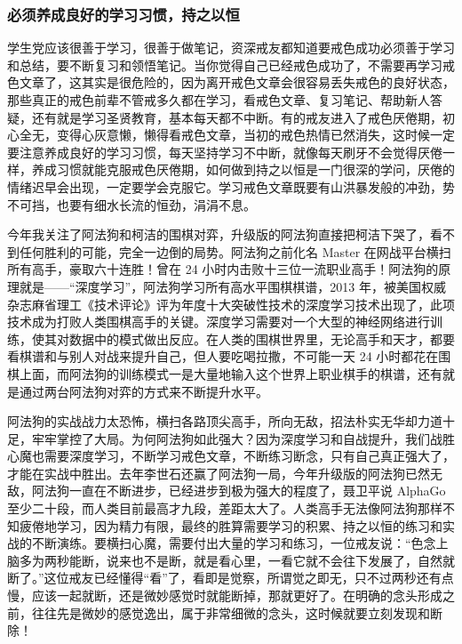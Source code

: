 \subsubsection{必须养成良好的学习习惯，持之以恒}

学生党应该很善于学习，很善于做笔记，资深戒友都知道要戒色成功必须善于学习和总结，要不断复习和领悟笔记。当你觉得自己已经戒色成功了，不需要再学习戒色文章了，这其实是很危险的，因为离开戒色文章会很容易丢失戒色的良好状态，那些真正的戒色前辈不管戒多久都在学习，看戒色文章、复习笔记、帮助新人答疑，还有就是学习圣贤教育，基本每天都不中断。有的戒友进入了戒色厌倦期，初心全无，变得心灰意懒，懒得看戒色文章，当初的戒色热情已然消失，这时候一定要注意养成良好的学习习惯，每天坚持学习不中断，就像每天刷牙不会觉得厌倦一样，养成习惯就能克服戒色厌倦期，如何做到持之以恒是一门很深的学问，厌倦的情绪迟早会出现，一定要学会克服它。学习戒色文章既要有山洪暴发般的冲劲，势不可挡，也要有细水长流的恒劲，涓涓不息。

今年我关注了阿法狗和柯洁的围棋对弈，升级版的阿法狗直接把柯洁下哭了，看不到任何胜利的可能，完全一边倒的局势。阿法狗之前化名 Master 在网战平台横扫所有高手，豪取六十连胜！曾在 24 小时内击败十三位一流职业高手！阿法狗的原理就是——“深度学习”，阿法狗学习所有高水平围棋棋谱，2013 年，被美国权威杂志麻省理工《技术评论》评为年度十大突破性技术的深度学习技术出现了，此项技术成为打败人类围棋高手的关键。深度学习需要对一个大型的神经网络进行训练，使其对数据中的模式做出反应。在人类的围棋世界里，无论高手和天才，都要看棋谱和与别人对战来提升自己，但人要吃喝拉撒，不可能一天 24 小时都花在围棋上面，而阿法狗的训练模式一是大量地输入这个世界上职业棋手的棋谱，还有就是通过两台阿法狗对弈的方式来不断提升水平。

阿法狗的实战战力太恐怖，横扫各路顶尖高手，所向无敌，招法朴实无华却力道十足，牢牢掌控了大局。为何阿法狗如此强大？因为深度学习和自战提升，我们战胜心魔也需要深度学习，不断学习戒色文章，不断练习断念，只有自己真正强大了，才能在实战中胜出。去年李世石还赢了阿法狗一局，今年升级版的阿法狗已然无敌，阿法狗一直在不断进步，已经进步到极为强大的程度了，聂卫平说 AlphaGo 至少二十段，而人类目前最高才九段，差距太大了。人类高手无法像阿法狗那样不知疲倦地学习，因为精力有限，最终的胜算需要学习的积累、持之以恒的练习和实战的不断演练。要横扫心魔，需要付出大量的学习和练习，一位戒友说：“色念上脑多为两秒能断，说来也不是断，就是看心里，一看它就不会往下发展了，自然就断了。”这位戒友已经懂得“看”了，看即是觉察，所谓觉之即无，只不过两秒还有点慢，应该一起就断，还是微妙感觉时就能断掉，那就更好了。在明确的念头形成之前，往往先是微妙的感觉逸出，属于非常细微的念头，这时候就要立刻发现和断除！

